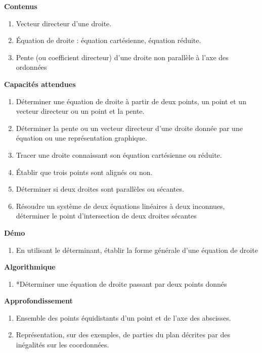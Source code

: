 \documentclass[10pt,a4paper]{article}
\begin{document}
\textbf{Contenus}

\begin{enumerate}
\item Vecteur directeur d'une droite.
\item Équation de droite : équation cartésienne, équation réduite.
\item Pente (ou coefficient directeur) d'une droite non parallèle à l'axe des ordonnées
\end{enumerate}

\textbf{Capacités attendues}
 
\begin{enumerate}
\item  Déterminer une équation de droite à partir de deux points, un point et un vecteur 
directeur ou un point et la pente.
\item  Déterminer la pente ou un vecteur directeur d’une droite donnée par une équation ou 
une représentation graphique.
\item  Tracer une droite connaissant son équation cartésienne ou réduite.
\item  Établir que trois points sont alignés ou non.
\item  Déterminer si deux droites sont parallèles ou sécantes.
\item  Résoudre un système de deux équations linéaires à deux inconnues, déterminer le 
point d’intersection de deux droites sécantes
\end{enumerate}

\textbf{Démo}

\begin{enumerate}
\item  En utilisant le déterminant, établir la forme générale d'une équation de droite
\end{enumerate}

\textbf{Algorithmique}

\begin{enumerate}
\item *Déterminer une équation de droite passant par deux points donnés
\end{enumerate}

\textbf{Approfondissement}

\begin{enumerate}
\item Ensemble des points équidistants d'un point et de l'axe des abscisses.
\item Représentation, sur des exemples, de parties du plan décrites par des inégalités sur les coordonnées.
\end{enumerate}
\end{document}
